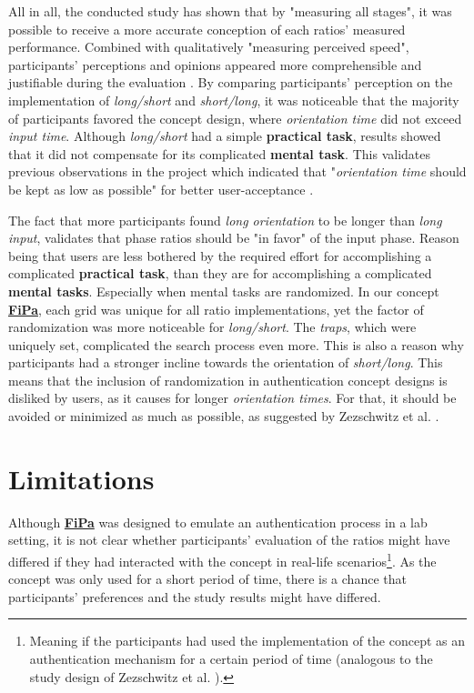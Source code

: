 All in all, the conducted study has shown that by "measuring all stages", it was possible to receive a more accurate conception of each ratios' measured performance. Combined with qualitatively "measuring perceived speed", participants' perceptions and opinions appeared more comprehensible and justifiable during the evaluation \cite{Zezschwitz}. By comparing participants' perception on the implementation of \textit{long/short} and \textit{short/long}, it was noticeable that the majority of participants favored the concept design, where \textit{orientation time} did not exceed \textit{input time}. Although \textit{long/short} had a simple \textbf{practical task}, results showed that it did not compensate for its complicated \textbf{mental task}. This validates previous observations in the project which indicated that "\textit{orientation time} should be kept as low as possible" for better user-acceptance \cite{Zezschwitz}.

The fact that more participants found \textit{long orientation} to be longer than \textit{long input}, validates that phase ratios should be "in favor" of the input phase. Reason being that users are less bothered by the required effort for accomplishing a complicated \textbf{practical task}, than they are for accomplishing a  complicated \textbf{mental tasks}. Especially when mental tasks are randomized. In our concept \underline{\textbf{FiPa}}, each grid was unique for all ratio implementations, yet the factor of randomization was more noticeable for \textit{long/short}. The \textit{traps}, which were uniquely set, complicated the search process even more. This is also a reason why participants had a stronger incline towards the orientation of \textit{short/long}. This means that the inclusion of randomization in authentication concept designs is disliked by users, as it causes for longer \textit{orientation times}. For that, it should be avoided or minimized as much as possible, as suggested by Zezschwitz et al. \cite{Zezschwitz}.

\section{Limitations}

Although \underline{\textbf{FiPa}} was designed to emulate an authentication process in a lab setting, it is not clear whether participants' evaluation of the ratios might have differed if they had interacted with the concept in real-life scenarios\footnote{Meaning if the participants had used the implementation of the concept as an authentication mechanism for a certain period of time (analogous to the study design of Zezschwitz et al. \cite{Zezschwitz}).}. As the concept was only used for a short period of time, there is a chance that participants' preferences and the study results might have differed.\\

